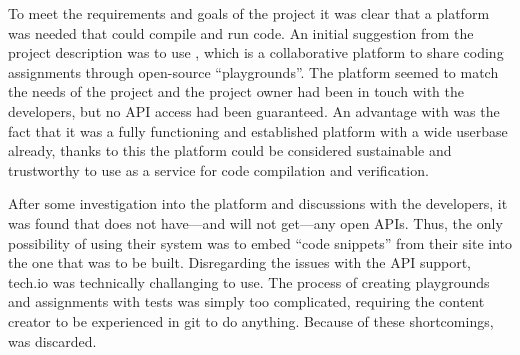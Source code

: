 To meet the requirements and goals of the project it was clear that a platform was needed that could compile and run code. An initial suggestion from the project description was to use \techio{}, which is a collaborative platform to share coding assignments through open-source ``playgrounds''. The platform seemed to match the needs of the project and the project owner had been in touch with the developers, but no API access had been guaranteed. An advantage with \techio{} was the fact that it was a fully functioning and established platform with a wide userbase already, thanks to this the platform could be considered sustainable and trustworthy to use as a service for code compilation and verification.

After some investigation into the platform and discussions with the developers, it was found that \techio{} does not have---and will not get---any open APIs. Thus, the only possibility of using their system was to  embed ``code snippets'' from their site into the one that was to be built. Disregarding the issues with the API support, tech.io was technically challanging to use. The process of creating playgrounds and assignments with tests was simply too complicated, requiring the content creator to be experienced in git to do anything. Because of these shortcomings, \techio{} was discarded.\\

